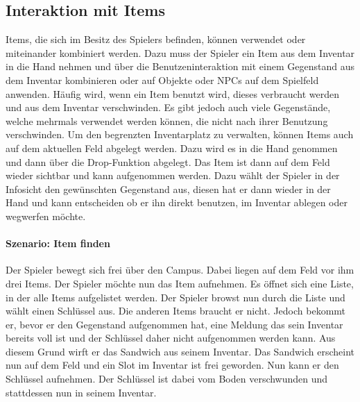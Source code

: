 \subsection{Interaktion mit Items}
\glspl{Item}, die sich im Besitz des \gls{Spieler}s befinden, können verwendet oder miteinander kombiniert 
werden. Dazu muss der \gls{Spieler} ein \gls{Item} aus dem Inventar in die Hand nehmen und über die 
Benutzeninteraktion
mit einem Gegenstand aus dem Inventar kombinieren oder auf Objekte oder NPCs auf dem Spielfeld 
anwenden. Häufig wird, wenn ein \gls{Item} benutzt wird, dieses verbraucht werden und aus dem \gls{Inventar}
verschwinden. Es gibt jedoch auch viele Gegenstände, welche mehrmals verwendet werden können, die nicht nach
ihrer Benutzung verschwinden. Um den begrenzten \gls{Inventar}platz zu verwalten, können \glspl{Item} auch
auf dem 
aktuellen \gls{Feld} abgelegt werden. Dazu wird es in die Hand genommen und dann über die Drop-Funktion 
abgelegt. Das \gls{Item} ist dann auf dem Feld wieder sichtbar und kann aufgenommen werden. Dazu wählt der 
\gls{Spieler} in der Infosicht den gewünschten Gegenstand aus, diesen hat er dann wieder in der Hand 
und kann entscheiden ob er ihn direkt benutzen, im Inventar ablegen oder wegwerfen möchte.

\paragraph{Szenario: Item finden}
Der \gls{Spieler} bewegt sich frei über den Campus. Dabei liegen auf dem Feld vor ihm drei \glspl{Item}. Der 
Spieler möchte nun das \gls{Item} aufnehmen. Es öffnet sich eine Liste, in der alle \glspl{Item} aufgelistet 
werden. Der \gls{Spieler} browst nun durch die Liste und wählt einen Schlüssel aus. Die anderen \glspl{Item}
braucht er nicht. Jedoch bekommt er, bevor er den Gegenstand aufgenommen hat, eine Meldung das sein Inventar
bereits voll ist und der Schlüssel daher nicht aufgenommen werden kann. Aus diesem Grund wirft er das Sandwich
aus seinem Inventar. Das Sandwich erscheint nun auf dem Feld und ein Slot im Inventar ist frei geworden. Nun 
kann er den Schlüssel aufnehmen. Der Schlüssel ist dabei vom Boden verschwunden und stattdessen nun in seinem 
Inventar.

